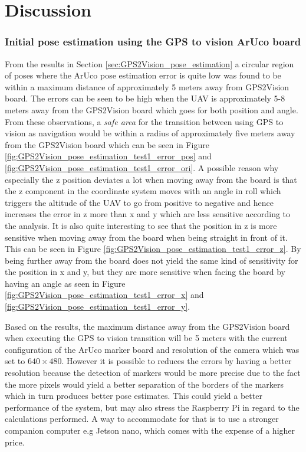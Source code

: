 \documentclass[../Head/report.tex]{subfiles}
\begin{document}
\section{Discussion}
\label{sec:discussion}

\subsubsection*{Initial pose estimation using the GPS to vision ArUco board}
From the results in Section \ref{sec:GPS2Vision_pose_estimation} a circular region of poses where the ArUco pose estimation error is quite low was found to be within a maximum distance of approximately 5 meters away from GPS2Vision board. The errors can be seen to be high when the UAV is approximately 5-8 meters away from the GPS2Vision board which goes for both position and angle. From these observations, a \textit{safe area} for the transition between using GPS to vision as navigation would be within a radius of approximately five meters away from the GPS2Vision board which can be seen in Figure \ref{fig:GPS2Vision_pose_estimation_test1_error_pos} and \ref{fig:GPS2Vision_pose_estimation_test1_error_ori}. A possible reason why especially the z position deviates a lot when moving away from the board is that the z component in the coordinate system moves with an angle in roll which triggers the altitude of the UAV to go from positive to negative and hence increases the error in z more than x and y which are less sensitive according to the analysis. It is also quite interesting to see that the position in z is more sensitive when moving away from the board when being straight in front of it. This can be seen in Figure \ref{fig:GPS2Vision_pose_estimation_test1_error_z}. By being further away from the board does not yield the same kind of sensitivity for the position in x and y, but they are more sensitive when facing the board by having an angle as seen in Figure \ref{fig:GPS2Vision_pose_estimation_test1_error_x} and \ref{fig:GPS2Vision_pose_estimation_test1_error_y}.   

Based on the results, the maximum distance away from the GPS2Vision board when executing the GPS to vision transition will be 5 meters with the current configuration of the ArUco marker board and resolution of the camera which was set to $640 \times 480$. However it is possible to reduces the errors by having a better resolution because the detection of markers would be more precise due to the fact the more pixels would yield a better separation of the borders of the markers which in turn produces better pose estimates. This could yield a better performance of the system, but may also stress the Raspberry Pi in regard to the calculations performed. A way to accommodate for that is to use a stronger companion computer e.g Jetson nano, which comes with the expense of a higher price.
\end{document}

